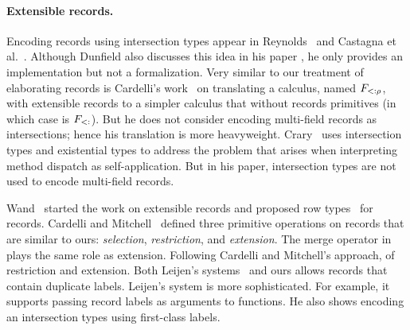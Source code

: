 \paragraph{Extensible records.}



Encoding records using intersection types appear in
Reynolds~\cite{reynolds1997design} and Castagna et
al.~\cite{castagna1995calculus}. Although Dunfield also discusses this idea in
his paper \cite{dunfield2014elaborating}, he only provides an implementation but
not a formalization. Very similar to our treatment of elaborating records is
Cardelli's work~\cite{cardelli1992extensible} on translating a calculus, named
$ F_{<: \rho}$, with extensible records to a simpler calculus that without
records primitives (in which case is $ F_{<:} $). But he does not consider
encoding multi-field records as intersections; hence his translation is more
heavyweight. Crary~\cite{crary1998simple} uses intersection types and
existential types to address the problem that arises when interpreting method
dispatch as self-application. But in his paper, intersection types are not used
to encode multi-field records.

Wand~\cite{wand1987complete} started the work on extensible records and proposed
row types~\cite{wand1989type} for records. Cardelli and
Mitchell~\cite{cardelli1990operations} defined three primitive operations on
records that are similar to ours: \emph{selection}, \emph{restriction}, and
\emph{extension}. The merge operator in \name plays the same role as extension.
Following Cardelli and Mitchell's approach,
of restriction and extension. Both Leijen's systems~\cite{leijen2004first,leijen2005extensible} 
and ours allows records that contain
duplicate labels. Leijen's system is more sophisticated. For example, it supports
passing record labels as arguments to functions. He also shows encoding an
intersection types using first-class labels. 

\begin{comment}
Chlipala's
\texttt{Ur}~\cite{chlipala2010ur} explains record as type level
constructs.\bruno{What is the point of citing Chlipala's paper?}
\end{comment}

